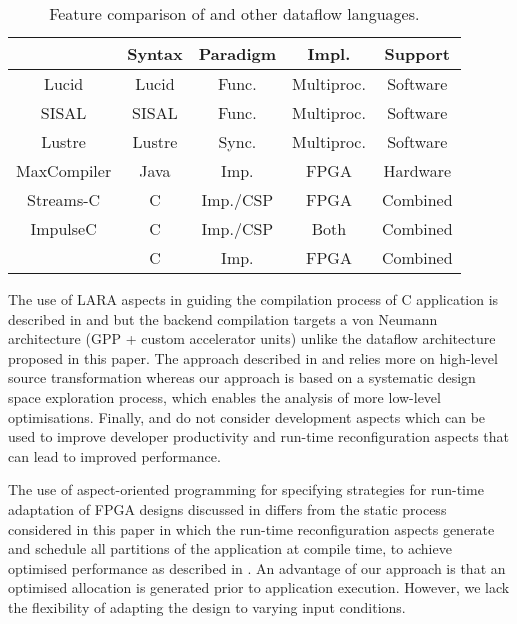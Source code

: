 \begin{table}[!h]
  \renewcommand{\arraystretch}{1.2}
  \centering
  \caption{Feature comparison of \MAXC{} and other dataflow languages.}
  \label{table:feature-comparison}
  \begin{tabular}{ c |  c |  c |  c |  c }
    \hline
    \           & \bf{Syntax} & \bf{Paradigm} & \bf{Impl.} & \bf{Support} \\
    \hline \hline
    Lucid       & Lucid       & Func.         & Multiproc. & Software     \\
    SISAL       & SISAL       & Func.         & Multiproc. & Software     \\
    Lustre      & Lustre      & Sync.         & Multiproc. & Software     \\
    MaxCompiler & Java        & Imp.          & FPGA       & Hardware     \\
    Streams-C   & C           & Imp./CSP      & FPGA       & Combined     \\
    ImpulseC    & C           & Imp./CSP      & Both       & Combined     \\
    \MAXC{}     & C           & Imp.          & FPGA       & Combined     \\
  \end{tabular}
\end{table}

The use of LARA aspects in guiding the compilation process of C
application is described in
\cite{Cardoso:Teixeira:Alves:Nobre:Diniz:Cutinho:Luk:2012} and
\cite{cardoso2011new} but the backend compilation targets a von
Neumann architecture (GPP + custom accelerator units) unlike the
dataflow architecture proposed in this paper. The approach described
in \cite{Cardoso:Teixeira:Alves:Nobre:Diniz:Cutinho:Luk:2012} and
\cite{cardoso2011new} relies more on high-level source transformation
whereas our approach is based on a systematic design space
exploration process, which enables the analysis of more low-level
optimisations. Finally,
\cite{Cardoso:Teixeira:Alves:Nobre:Diniz:Cutinho:Luk:2012} and
\cite{cardoso2011new} do not consider development aspects which can be
used to improve developer productivity and run-time reconfiguration
aspects that can lead to improved performance.

The use of aspect-oriented programming for specifying strategies for
run-time adaptation of FPGA designs discussed in \cite{6322875}
differs from the static process considered in this paper in which the
run-time reconfiguration aspects generate and schedule all partitions
of the application at compile time, to achieve optimised performance
as described in \cite{Xinyu:Qiwei:Luk:Qiang:Pell:2012}. An advantage
of our approach is that an optimised allocation is generated prior to
application execution. However, we lack the flexibility of adapting the
design to varying input conditions.
